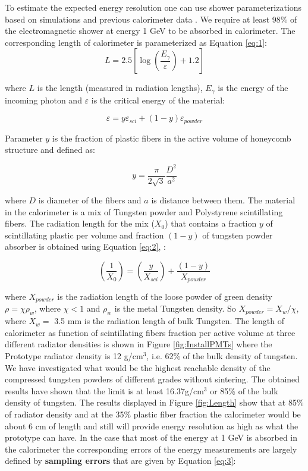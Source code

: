 To estimate the expected energy resolution one can use shower parameterizations based on simulations and previous calorimeter data \cite{wigmans2000calorimetry}. We require at least 98\% of the electromagnetic shower at energy 1 GeV to be absorbed in calorimeter. The corresponding length of calorimeter is parameterized as Equation \ref{eq:1}:
\begin{equation} \label{eq:1}
    L = 2.5\left[ \log \left( \frac{E_{\gamma}}{\varepsilon} \right) + 1.2 \right]
\end{equation}

where $L$ is the length (measured in radiation lengths), $E_{\gamma}$ is the energy of the incoming photon and $\varepsilon$ is the critical energy of the material:

\begin{equation}
    \varepsilon = y\varepsilon_{sci} + (1-y)\varepsilon_{powder}
\end{equation}

Parameter $y$ is the fraction of plastic fibers in the active volume of honeycomb structure and defined as:

\begin{equation}
    y = \frac{\pi}{2\sqrt{3}}\frac{D^2}{a^2}
\end{equation}

where $D$ is diameter of the fibers and $a$ is distance between them. The material in the calorimeter is a mix of Tungsten powder and Polystyrene scintillating fibers. The radiation length for the mix ($X_0$) that contains a fraction $y$ of scintillating plastic per volume and fraction $(1-y)$ of tungsten powder absorber is obtained using Equation \ref{eq:2}, \cite{Fabjan1985}:

\begin{equation} \label{eq:2}
    \left( \frac{1}{X_0} \right) = \left( \frac{y}{X_{sci}} \right) + \frac{(1-y)}{X_{powder}}
\end{equation}

 where $X_{powder}$ is the radiation length of the loose powder of green density $\rho = \chi \rho_w$, where $\chi < 1$ and $\rho_w$ is the metal Tungsten density. So $X_{powder} = X_w/\chi$, where $X_w =$ 3.5 mm is the radiation length of bulk Tungsten. The length of calorimeter as function of scintillating fibers fraction per active volume at three different radiator densities is shown in Figure \ref{fig:InstallPMTs} where the Prototype radiator density is 12 g/cm$^3$, i.e. 62\% of the bulk density of tungsten. We have investigated what would be the highest reachable density of the compressed tungsten powders of different grades without sintering. The obtained results have shown that the limit is at least 16.37g/cm$^3$ or 85\% of the bulk density of tungsten. The results displayed in Figure \ref{fig:Length} show that at 85\% of radiator density and at the 35\% plastic fiber fraction the calorimeter would be about 6 cm of length and still will provide energy resolution as high as what the prototype can have. In the case that most of the energy at 1 GeV is absorbed in the calorimeter the corresponding errors of the energy measurements are largely defined by \textbf{sampling errors} that are given by Equation \ref{eq:3}:
 
